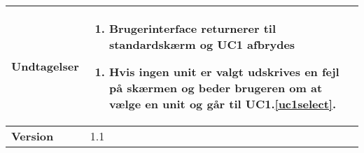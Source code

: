 \begin{table}[H]
\begin{tabular} {|p{6cm}|p{8cm}|}
		\textbf{Undtagelser}					
		&\begin{enumerate}[label= \ref{uc1ex1}a.]
			\item Brugerinterface returnerer til standardskærm og UC1 afbrydes
		\end{enumerate}
											
		\begin{enumerate}[label= \ref{uc1ex2}a.]
			\item Hvis ingen unit er valgt udskrives en fejl på skærmen og beder brugeren om at vælge en unit og går til UC1.\ref{uc1select}.
		\end{enumerate} \\\hline
											
		\textbf{Version}		&1.1 \\\hline

	\end{tabular}
	\label{UC2} 
\end{table}